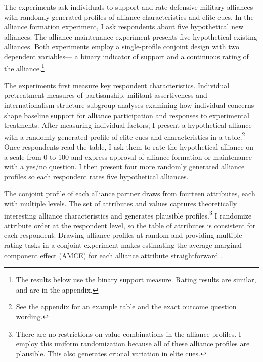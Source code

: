\documentclass[12pt]{article}
\begin{document}
The experiments ask individuals to support and rate defensive military alliances with randomly generated profiles of alliance characteristics and elite cues. 
In the alliance formation experiment, I ask respondents about five hypothetical new alliances. 
The alliance maintenance experiment presents five hypothetical existing alliances.
Both experiments employ a single-profile conjoint design with two dependent variables--- a binary indicator of support and a continuous rating of the alliance.\footnote{The results below use the binary support measure. Rating results are similar, and are in the appendix.} 


The experiments first measure key respondent characteristics.  
Individual pretreatment measures of partisanship, militant assertiveness and internationalism structure subgroup analyses examining how individual concerns shape baseline support for alliance participation and responses to experimental treatments. 
After measuring individual factors, I present a hypothetical alliance with a randomly generated profile of elite cues and characteristics in a table.\footnote{See the appendix for an example table and the exact outcome question wording.} 
Once respondents read the table, I ask them to rate the hypothetical alliance on a scale from 0 to 100 and express approval of alliance formation or maintenance with a yes/no question. 
I then present four more randomly generated alliance profiles so each respondent rates five hypothetical alliances.


The conjoint profile of each alliance partner draws from fourteen attributes, each with multiple levels. 
The set of attributes and values captures theoretically interesting alliance characteristics and generates plausible profiles.\footnote{There are no restrictions on value combinations in the alliance profiles. I employ this uniform randomization because all of these alliance profiles are plausible. This also generates crucial variation in elite cues.}
I randomize attribute order at the respondent level, so the table of attributes is consistent for each respondent. 
Drawing alliance profiles at random and providing multiple rating tasks in a conjoint experiment makes estimating the average marginal component effect (AMCE) for each alliance attribute straightforward \citep{Hainmuelleretal2014}. 
\end{document}
